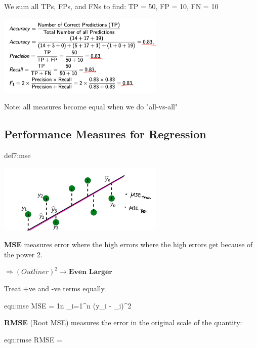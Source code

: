 \documentclass{tron}
\begin{document}
\begin{example}
	\begin{example}{}
	We sum all TPs, FPs, and FNs to find: TP = 50, FP = 10, FN = 10
	
	\includegraphics[width = 300px]{Figs/Lec7/ex3-all-vs-all}
	
	Note: all measures become equal when we do "all-vs-all"
	\end{example}	
\end{example}


\newpage
\subsection{Performance Measures for Regression}
\vspace{5pt}

\begin{definition}{def7:mse}
	\begin{center}
		\includegraphics[width = 300px]{Figs/Lec7/mse}
	\end{center}

	\textbf{MSE} measures error where the high errors where the high errors get  because of the power 2. 
	
	$\Rightarrow (Outliner)^2 \rightarrow \textbf{Even Larger}$
	
	Treat +ve and -ve terms equally.
	
	\begin{eqn}[MSE]{eqn:mse}
		MSE = \frac1n \sum_{i=1}^n (y_i - _i)^2		
	\end{eqn}

	
	\textbf{RMSE} (Root MSE) measures the error in the original scale of the quantity:
	\begin{eqn}[RMSE]{eqn:rmse}
		RMSE = 
	\end{eqn}
\end{definition}
\end{document}
